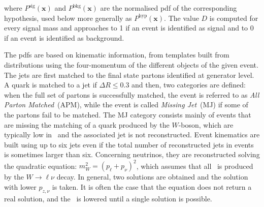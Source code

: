 where $P^{\text{sig}}(\textbf{x})$ and $P^{\text{bkg}}(\textbf{x})$ are the normalised pdf of the corresponding hypothesis, used below more generally as $P^{\text{hyp}}(\textbf{x})$. The value $D$ is computed for every signal mass and approaches to 1 if an event is identified as signal and to 0 if an event is identified as background.

The pdfs are based on kinematic information, from templates built from distributions using the four-momentum of the different objects of the given event. The jets are first matched to the final state partons identified at generator level. A quark is matched to a jet if $\Delta R\leq 0.3$ and then, two categories are defined: when the full set of partons is successfully matched, the event is referred to as \textit{All Parton Matched}~(APM), while the event is called \textit{Missing Jet}~(MJ) if some of the partons fail to be matched. The MJ category consists mainly of events that are missing the matching of a quark produced by the $W$-boson, which are typically low in \pT\ and the associated jet is not reconstructed. Event kinematics are built using up to six jets even if the total number of reconstructed jets in events is sometimes larger than six. %
Concerning neutrinos, they are reconstructed solving the quadratic equation: $m_W^2 = (p_\ell + p_\nu)^2$, which assumes that all \MET\ is produced by the $W\to\ell\nu$ decay. In general, two solutions are obtained and the solution with lower $p_{z,\nu}$ is taken. It is often the case that the equation does not return a real solution, and the \MET\ is lowered until a single solution is possible.

